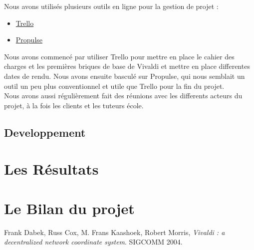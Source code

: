 \documentclass[11pt,a4paper]{article}
\begin{document}
Nous avons utilisés plusieurs outils en ligne pour la gestion de projet :
\begin{itemize}
\item \href{https://www.trello.com}{Trello}
\item \href{http://ppulse.f}{Propulse}
\end{itemize}

Nous avons commencé par utiliser Trello pour mettre en place le cahier des charges et les premières briques de base de Vivaldi et mettre en place differentes dates de rendu. Nous avons ensuite basculé sur Propulse, qui nous semblait un outil un peu plus conventionnel et utile que Trello pour la fin du projet.\\

Nous avons aussi régulièrement fait des réunions avec les differents acteurs du projet, à la fois les clients et les tuteurs école.

\subsection{Developpement}
\label{subsec:dev}

\section{Les Résultats}

\section{Le Bilan du projet}

\begin{thebibliography}{9}

  Frank Dabek, Russ Cox, M. Frans Kaashoek, Robert Morris,
  \emph{Vivaldi : a decentralized network coordinate system}.
  SIGCOMM 2004.

\end{thebibliography}
\end{document}
